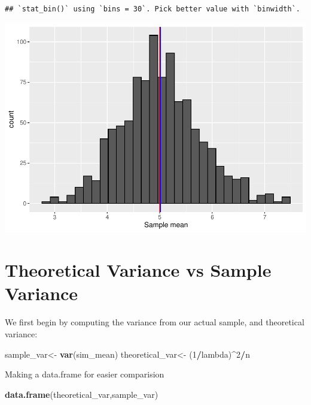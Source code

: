 \documentclass[
]{article}
\newenvironment{Shaded}{\begin{snugshade}}{\end{snugshade}}
\newcommand{\DecValTok}[1]{\textcolor[rgb]{0.00,0.00,0.81}{#1}}
\newcommand{\KeywordTok}[1]{\textcolor[rgb]{0.13,0.29,0.53}{\textbf{#1}}}
\newcommand{\NormalTok}[1]{#1}
\newcommand{\OperatorTok}[1]{\textcolor[rgb]{0.81,0.36,0.00}{\textbf{#1}}}
\newcommand{\StringTok}[1]{\textcolor[rgb]{0.31,0.60,0.02}{#1}}
\begin{document}
\begin{verbatim}
## `stat_bin()` using `bins = 30`. Pick better value with `binwidth`.
\end{verbatim}

\includegraphics{StatisticalInference_Project_Week4_files/figure-latex/unnamed-chunk-8-1.pdf}

\hypertarget{theoretical-variance-vs-sample-variance}{%
\section{Theoretical Variance vs Sample
Variance}\label{theoretical-variance-vs-sample-variance}}

We first begin by computing the variance from our actual sample, and
theoretical variance:

\begin{Shaded}
\begin{Highlighting}[]
\NormalTok{sample_var<-}\StringTok{ }\KeywordTok{var}\NormalTok{(sim_mean)}
\NormalTok{theoretical_var<-}\StringTok{ }\NormalTok{(}\DecValTok{1}\OperatorTok{/}\NormalTok{lambda)}\OperatorTok{^}\DecValTok{2}\OperatorTok{/}\NormalTok{n}
\end{Highlighting}
\end{Shaded}

Making a data.frame for easier comparision

\begin{Shaded}
\begin{Highlighting}[]
\KeywordTok{data.frame}\NormalTok{(theoretical_var,sample_var)}
\end{Highlighting}
\end{Shaded}
\end{document}
